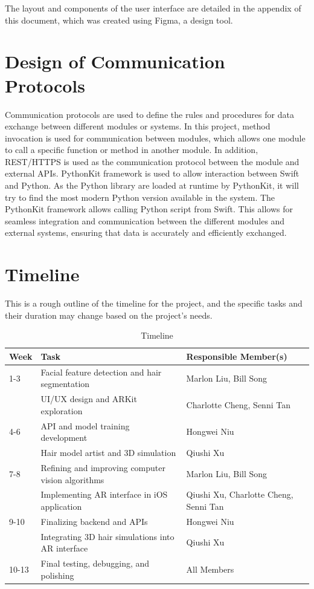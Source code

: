 \documentclass[12pt, titlepage]{article}
\begin{document}
\noindent The layout and components of the user interface are detailed in the appendix of this document, which was created using Figma, a design tool.

\section{Design of Communication Protocols}

Communication protocols are used to define the rules and procedures for data exchange between different modules or systems. In this project, method invocation is used for communication between modules, which allows one module to call a specific function or method in another module. In addition, REST/HTTPS is used as the communication protocol between the module and external APIs. PythonKit framework is used to allow interaction between Swift and Python. As the Python library are loaded at runtime by PythonKit, it will try to find the most modern Python version available in the system. The PythonKit framework allows calling Python script from Swift.
This allows for seamless integration and communication between the different modules and external systems, ensuring that data is accurately and efficiently exchanged.

\section{Timeline}
This is a rough outline of the timeline for the project, and the specific tasks and their duration may change based on the project's needs.

\begin{table}[H]

\begin{tabularx}{\textwidth}{lXXX}
\toprule
\textbf{Week} & \textbf{Task} & \textbf{Responsible Member(s)}\\
\midrule
1-3 & Facial feature detection and hair segmentation & Marlon Liu, Bill Song \\
& UI/UX design and ARKit exploration & Charlotte Cheng, Senni Tan \\
\midrule
4-6 & API and model training development & Hongwei Niu \\
& Hair model artist and 3D simulation & Qiushi Xu \\
\midrule
7-8 & Refining and improving computer vision algorithms & Marlon Liu, Bill Song \\
& Implementing AR interface in iOS application & Qiushi Xu, Charlotte Cheng, Senni Tan  \\
\midrule
9-10 & Finalizing backend and APIs & Hongwei Niu \\
& Integrating 3D hair simulations into AR interface & Qiushi Xu \\
\midrule
10-13 & Final testing, debugging, and polishing & All Members \\
\bottomrule
\bottomrule
\end{tabularx}
\caption{Timeline} \label{TblTimeline}
\end{table}
\end{document}
